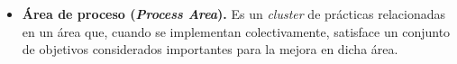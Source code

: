 \begin{itemize}
\item \textbf{\hypertarget{processarea}{Área de proceso} (\textit{Process Area}).} Es un \textit{cluster} de prácticas relacionadas en un área que, cuando se implementan colectivamente, satisface un conjunto de objetivos considerados importantes para la mejora en dicha área. 

\end{itemize}
